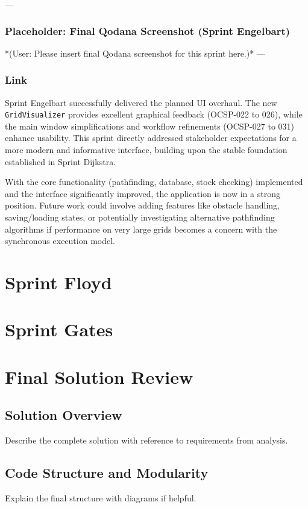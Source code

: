 --- %
\subsubsection*{Placeholder: Final Qodana Screenshot (Sprint Engelbart)}
*(User: Please insert final Qodana screenshot for this sprint here.)*
---

\subsubsection{Link}
Sprint Engelbart successfully delivered the planned UI overhaul. The new \verb|GridVisualizer| provides excellent graphical feedback (OCSP-022 to 026), while the main window simplifications and workflow refinements (OCSP-027 to 031) enhance usability. This sprint directly addressed stakeholder expectations for a more modern and informative interface, building upon the stable foundation established in Sprint Dijkstra.

With the core functionality (pathfinding, database, stock checking) implemented and the interface significantly improved, the application is now in a strong position. Future work could involve adding features like obstacle handling, saving/loading states, or potentially investigating alternative pathfinding algorithms if performance on very large grids becomes a concern with the synchronous execution model.


\newpage

\section{Sprint Floyd}

\section{Sprint Gates}

\section{Final Solution Review}

\subsection{Solution Overview}
Describe the complete solution with reference to requirements from analysis.

\subsection{Code Structure and Modularity}
Explain the final structure with diagrams if helpful.


